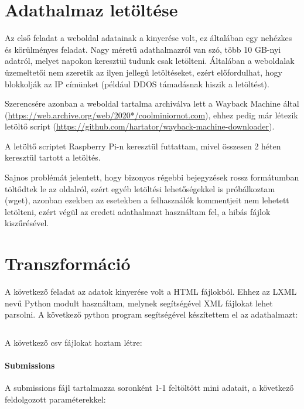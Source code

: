 \documentclass[14pt,a4paper]{article}
\begin{document}
\section{Adathalmaz letöltése}

Az első feladat a weboldal adatainak a kinyerése volt, ez általában egy nehézkes és körülményes feladat. Nagy
méretű adathalmazról van szó, több 10 GB-nyi adatról, melyet napokon keresztül tudunk csak letölteni. Általában a
weboldalak üzemeltetői nem szeretik az ilyen jellegű letöltéseket, ezért előfordulhat, hogy blokkolják az IP
címünket (például DDOS támadásnak hiszik a letöltést).

Szerencsére azonban a weboldal tartalma archiválva lett a Wayback Machine által
(\href{https://web.archive.org/web/2020*/coolminiornot.com}{\url{https://web.archive.org/web/2020*/coolminiornot.com}}),
ehhez pedig már létezik letöltő script
(\href{https://github.com/hartator/wayback-machine-downloader}{\url{https://github.com/hartator/wayback-machine-downloader}}).

A letöltő scriptet Raspberry Pi-n keresztül futtattam, mivel összesen 2 héten keresztül tartott a letöltés.

Sajnos problémát jelentett, hogy bizonyos régebbi bejegyzések rossz formátumban töltődtek le az oldalról, ezért egyéb
letöltési lehetőségekkel is próbálkoztam (wget), azonban ezekben az esetekben a felhasználók kommentjeit nem lehetett
letölteni, ezért végül az eredeti adathalmazt használtam fel, a hibás fájlok kiszűrésével.

\section{Transzformáció}

A következő feladat az adatok kinyerése volt a HTML fájlokból. Ehhez az LXML nevű Python modult használtam, melynek
segítségével XML fájlokat lehet parsolni. A következő python program segítségével készítettem el az adathalmazt:

\inputminted[linenos, breaklines, fontsize=\footnotesize]{python}{../python/process.py}

A következő csv fájlokat hoztam létre:

\paragraph{Submissions}

A submissions fájl tartalmazza soronként 1-1 feltöltött mini adatait, a következő feldolgozott paraméterekkel:
\end{document}
